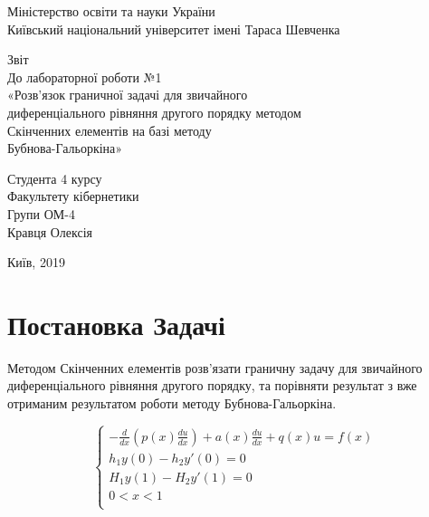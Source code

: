 \documentclass[14pt,a4paper]{scrartcl}
\begin{document}
	\begin{titlepage}
		\begin{center}
			\small{Міністерство освіти та науки України}\\
			\small{Київський національний університет імені Тараса Шевченка}\\
		\end{center}
			\vspace{15em}
		\begin{center}
			\large{Звіт}\\
			\large{До лабораторної роботи №1}\\
			\large{«Розв’язок граничної задачі для звичайного}\\
			\large{диференціального рівняння  другого порядку методом}\\
			\large{Скінченних елементів на базі методу}\\
			\large{Бубнова-Гальоркіна»}\\			
		\end{center}
			
		\vspace{10em}
		

	
		\begin{flushright}
			Студента 4 курсу\\
			Факультету кібернетики\\
			Групи ОМ-4\\
			Кравця Олексія\\
			
		\end{flushright}
		
		\vspace{\fill}

		
		\begin{center}
			\small{Київ, 2019}
		\end{center}
	
	\end{titlepage}


	\newpage

	\section{Постановка Задачі}
	Методом Скінченних елементів розв'язати граничну задачу для звичайного диференціального рівняння другого порядку, та порівняти результат з вже отриманим результатом роботи методу Бубнова-Гальоркіна.

	
	\begin{equation}\label{eq1}
		\begin{cases}
			-\frac{d}{dx}(p(x)\frac{du}{dx})+a(x)\frac{du}{dx}+q(x)u=f(x)  \\ 
			h_1y(0) - h_2y'(0) =0 \\
			H_1y(1) - H_2y'(1) =0 \\
			0<x<1\\
		\end{cases}
	\end{equation}
	
\end{document}
